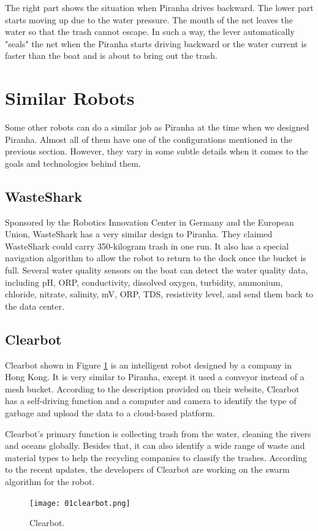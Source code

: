 The right part shows the situation when Piranha drives backward. The lower part starts moving up due to the water pressure. The mouth of the net leaves the water so that the trash cannot escape. In such a way, the lever automatically "seals" the net when the Piranha starts driving backward or the water current is faster than the boat and is about to bring out the trash. 

\section{Similar Robots}

Some other robots can do a similar job as Piranha at the time when we designed Piranha. Almost all of them have one of the configurations mentioned in the previous section. However, they vary in some subtle details when it comes to the goals and technologies behind them.

\subsection{WasteShark}

Sponsored by the Robotics Innovation Center in Germany and the European Union, WasteShark has a very similar design to Piranha. They claimed WasteShark could carry 350-kilogram trash in one run. It also has a special navigation algorithm to allow the robot to return to the dock once the bucket is full. Several water quality sensors on the boat can detect the water quality data, including pH, ORP, conductivity, dissolved oxygen, turbidity, ammonium, chloride, nitrate, salinity, mV, ORP, TDS, resistivity level, and send them back to the data center\cite{SCHMALTZ2020106067}.

\subsection{Clearbot}

Clearbot shown in Figure \ref{fig:01clearbot} is an intelligent robot designed by a company in Hong Kong. It is very similar to Piranha, except it used a conveyor instead of a mesh bucket. According to the description provided on their website, Clearbot has a self-driving function and a computer and camera to identify the type of garbage and upload the data to a cloud-based platform.

Clearbot's primary function is collecting trash from the water, cleaning the rivers and oceans globally. Besides that, it can also identify a wide range of waste and material types to help the recycling companies to classify the trashes. According to the recent updates, the developers of Clearbot are working on the swarm algorithm for the robot.

\begin{figure}[H]
    \centering
    \texttt{[image: 01clearbot.png]}
    \caption{Clearbot.}
    \label{fig:01clearbot}
\end{figure}